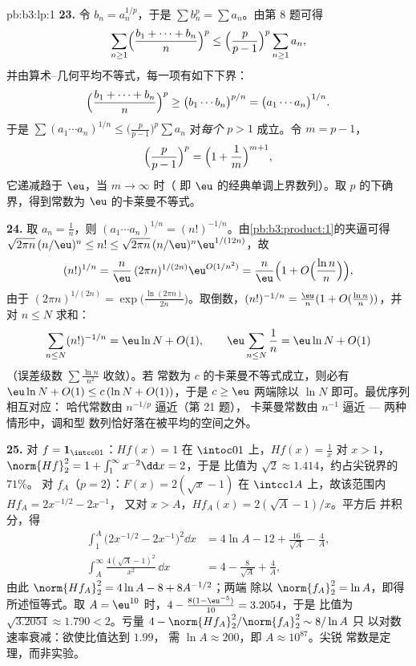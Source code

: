 \begin{solution}{pb:b3:lp:1}
\textbf{23.} 令 $b_n = a_n^{1/p}$，于是 $\sum b_n^p = \sum
a_n$。由第 8 题可得
\[
\sum_{n\geq1}\Bigl(\frac{b_1 + \dots + b_n}n\Bigr)^{p}
\leq \Bigl(\frac p{p-1}\Bigr)^{p}\sum_{n\geq1}a_n,
\]
并由算术–几何平均不等式，每一项有如下下界：
\[
\Bigl(\frac{b_1 + \dots + b_n}n\Bigr)^{p}
\geq \bigl(b_1\cdots b_n\bigr)^{p/n}
= \bigl(a_1\cdots a_n\bigr)^{1/n}.
\]
于是 $\sum(a_1\cdots a_n)^{1/n} \leq \bigl(\frac
p{p-1}\bigr)^p\sum a_n$ 对\emph{每个} $p > 1$ 成立。令 $m =
p - 1$，
\[
\Bigl(\frac p{p-1}\Bigr)^{p} =
\Bigl(1 + \frac1m\Bigr)^{m+1},
\]
它递减趋于 $\eu$，当 $m \to \infty$ 时（
即 $\eu$ 的经典单调上界数列）。取
$p$ 的下确界，得到常数为 $\eu$ 的卡莱曼不等式。

\textbf{24.} 取 $a_n = \frac1n$，则 $(a_1\cdots a_n)^{1/n} =
(n!)^{-1/n}$。由\cref{pb:b3:product:1}的夹逼可得
$\sqrt{2\pi n}\,(n/\eu)^n \leq n! \leq \sqrt{2\pi
n}\,(n/\eu)^n\eu^{1/(12n)}$，故
\[
(n!)^{1/n} = \frac n\eu\,(2\pi n)^{1/(2n)}
\eu^{O(1/n^2)}
= \frac n\eu\Bigl(1 +
O\Bigl(\frac{\ln n}{n}\Bigr)\Bigr),
\]
由于 $(2\pi n)^{1/(2n)} = \exp\bigl(\frac{\ln(2\pi
n)}{2n}\bigr)$。取倒数，$(n!)^{-1/n} = \frac\eu n(1 +
O(\frac{\ln n}n))$，并对 $n \leq N$ 求和：
\[
\sum_{n\leq N}(n!)^{-1/n}
= \eu\ln N + O(1),
\qquad
\eu\sum_{n\leq N}\frac1n = \eu\ln N + O(1)
\]
（误差级数 $\sum\frac{\ln n}{n^2}$ 收敛）。若
常数为 $c$ 的卡莱曼不等式成立，则必有 $\eu\ln N
+ O(1) \leq c\,(\ln N + O(1))$，于是 $c \geq \eu$
两端除以 $\ln N$ 即可。最优序列相互对应：
哈代常数由 $n^{-1/p}$ 逼近（第 21 题），
卡莱曼常数由 $n^{-1}$ 逼近 --- 两种情形中，调和型
数列恰好落在被平均的空间之外。

\textbf{25.} 对 $f = \mathbf 1_{\intcc01}$：$Hf(x) = 1$ 在
$\intoc01$ 上，$Hf(x) = \frac1x$ 对 $x > 1$，
$\norm{Hf}_2^2 = 1 + \int_1^\infty x^{-2}\dd x = 2$，于是
比值为 $\sqrt2 \approx 1.414$，约占尖锐界的 $71\%$。
对 $f_A$（$p = 2$）：$F(x) = 2(\sqrt x - 1)$ 在
$\intcc1A$ 上，故该范围内 $Hf_A = 2x^{-1/2} - 2x^{-1}$，
又对 $x > A$，$Hf_A(x) = 2(\sqrt A - 1)/x$。平方后
并积分，得
\begin{align*}
\int_1^A\bigl(2x^{-1/2} - 2x^{-1}\bigr)^2\dd x
&= 4\ln A - 12 + \frac{16}{\sqrt A} - \frac4A,\\
\int_A^{\infty}\frac{4(\sqrt A - 1)^2}{x^2}\,\dd x
&= 4 - \frac{8}{\sqrt A} + \frac4A,
\end{align*}
由此 $\norm{Hf_A}_2^2 = 4\ln A - 8 + 8A^{-1/2}$；两端
除以 $\norm{f_A}_2^2 = \ln A$，即得所述恒等式。取 $A
= \eu^{10}$ 时，$4 - \frac{8(1 - \eu^{-5})}{10} = 3.2054$，于是
比值为 $\sqrt{3.2054} \approx 1.790 < 2$。亏量
$4 - \norm{Hf_A}_2^2/\norm{f_A}_2^2 \sim 8/\ln A$ 只
以对数速率衰减：欲使比值达到 $1.99$，
需 $\ln A \approx 200$，即 $A \approx 10^{87}$。尖锐
常数是定理，而非实验。
\end{solution}
